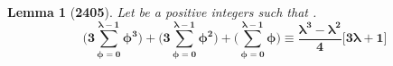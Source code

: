 \documentclass[preview]{standalone}
\newtheorem{lemma}{Lemma}
\begin{document}
\begin{lemma}[\textbf{2405}]
    Let \bm{$\iota$} be a positive integers such that
    \bm{$\big \lfloor \sqrt[3] \iota \big \rfloor = \lambda$}.
    \begin{equation*}
        \bm{
            \Bigg(
                3 \sum_{\phi=0}^{\lambda - 1} \phi ^3
            \Bigg)
                +
            \Bigg(
                3 \sum_{\phi=0}^{\lambda - 1} \phi ^2
            \Bigg)
                +
            \Bigg(
                \sum_{\phi=0}^{\lambda - 1} \phi
            \Bigg)
                \equiv
            \frac{
                \lambda ^3 - \lambda ^2
            }
            {4}
            \Bigg[ 3 \lambda + 1 \Bigg]
        }
    \end{equation*}
\end{lemma}
\end{document}
